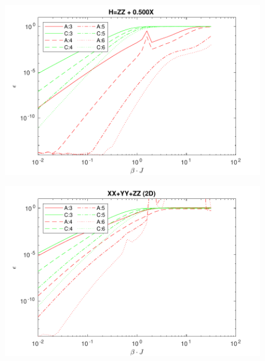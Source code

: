 \documentclass[aspectratio=169]{beamer}
\begin{document}
\begin{frame}
    \begin{figure}
        \includegraphics[scale=0.6]{Figures/1D_ising.pdf}
    \end{figure}
\end{frame}

\begin{frame}
    \begin{figure}
        \includegraphics[scale=0.6]{Figures/1D_heis.pdf}
    \end{figure}
\end{frame}
\end{document}

